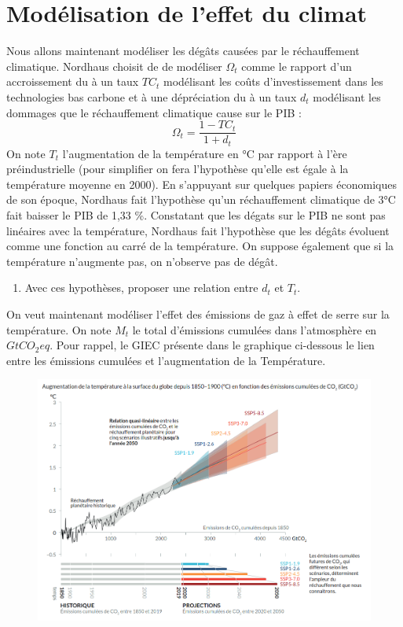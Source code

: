 \documentclass[12pt]{article}
\newcommand{\tco}{tCO_2eq}
\newcommand{\ques}[1]{\begin{enumerate}[resume]
\item  #1
\end{enumerate}}
\newcommand{\rep}[1]{\textit{Réponse :} #1 }
\renewcommand{\rep}[1]{ }
\theoremstyle{remark}
\begin{document}
\section{Modélisation de l'effet du climat}

Nous allons maintenant modéliser les dégâts causées par le réchauffement climatique. Nordhaus choisit de de modéliser $\Omega_t$ comme le rapport d'un accroissement du à un taux $TC_t$ modélisant les coûts d'investissement dans les technologies bas carbone et à une dépréciation du à un taux $d_t$ modélisant les dommages que le réchauffement climatique cause sur le PIB :
\begin{equation*}
\Omega_t=\frac{1-TC_t}{1+d_t}
\end{equation*}
On note $T_t$ l'augmentation de la température en °C par rapport à l'ère préindustrielle (pour simplifier on fera l'hypothèse qu'elle est égale à la température moyenne en 2000). En s'appuyant sur quelques papiers économiques de son époque, Nordhaus fait l'hypothèse qu'un réchauffement climatique de 3°C fait baisser le PIB de 1,33 \%. Constatant que les dégats sur le PIB ne sont pas linéaires avec la température, Nordhaus fait l'hypothèse que les dégâts évoluent comme une fonction au carré de la température. On suppose également que si la température n'augmente pas, on n'observe pas de dégât.

\ques{  Avec ces hypothèses, proposer une relation entre $d_t$ et $T_t$.
}
\rep{ \begin{equation*}
d_{t}=0,0133(\frac{T_t}{3})^2 \end{equation*}
}

On veut maintenant modéliser l'effet des émissions de gaz à effet de serre sur la température. On note $M_t$ le total d'émissions cumulées dans l'atmosphère en $G\tco$. Pour rappel, le GIEC présente dans le graphique ci-dessous le lien entre les émissions cumulées et l'augmentation de la Température.
\begin{figure}[h]
\centering
\includegraphics[scale=0.5]{images/Lien_GES_Temperature.png}
\end{figure}
\end{document}
